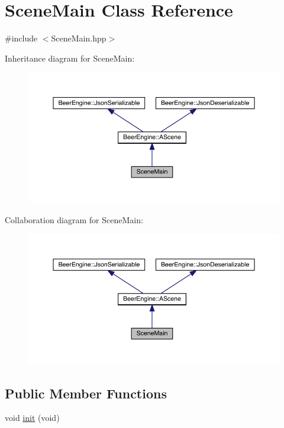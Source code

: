 \hypertarget{class_scene_main}{}\section{Scene\+Main Class Reference}
\label{class_scene_main}


{\ttfamily \#include $<$Scene\+Main.\+hpp$>$}



Inheritance diagram for Scene\+Main\+:
\nopagebreak
\begin{figure}[H]
\begin{center}
\leavevmode
\includegraphics[width=350pt]{class_scene_main__inherit__graph}
\end{center}
\end{figure}


Collaboration diagram for Scene\+Main\+:
\nopagebreak
\begin{figure}[H]
\begin{center}
\leavevmode
\includegraphics[width=350pt]{class_scene_main__coll__graph}
\end{center}
\end{figure}
\subsection*{Public Member Functions}
\begin{DoxyCompactItemize}
\item 
void \mbox{\hyperlink{class_scene_main_a4406dc5cf9807edcf360ba416de928e2}{init}} (void)
\end{DoxyCompactItemize}
